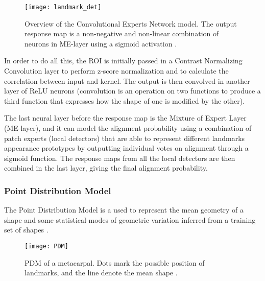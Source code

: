 \begin{figure}[H]
	\centering
	\texttt{[image: landmark\_det]}
	\caption{Overview of the Convolutional Experts Network model. The output response map is a non-negative and non-linear combination of neurons in ME-layer using a sigmoid activation \cite{Baltru2017}.}
	\label{fig:landmark_det}
\end{figure}

In order to do all this, the ROI is initially passed in a Contrast Normalizing Convolution layer to perform z-score normalization and to calculate the correlation between input and kernel. The output is then convolved in another layer of ReLU neurons (convolution is an operation on two functions to produce a third function that expresses how the shape of one is modified by the other).

The last neural layer before the response map is the Mixture of Expert Layer (ME-layer), and it can model the alignment probability using a combination of patch experts (local detectors) that are able to represent different landmarks appearance prototypes by outputting individual votes on alignment through a sigmoid function. The response maps from all the local detectors are then combined in the last layer, giving the final alignment probability.

\subsubsection{Point Distribution Model}
The Point Distribution Model is a used to represent the mean geometry of a shape and some statistical modes of geometric variation inferred from a training set of shapes \cite{wiki:PDM}. 

\begin{figure}[H]
	\centering
	\texttt{[image: PDM]}
	\caption{PDM of a metacarpal. Dots mark the possible position of landmarks, and the line denote the mean shape \cite{PDM}.}
	\label{fig:PDM}
\end{figure}

